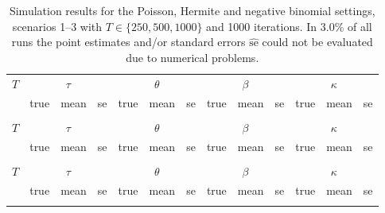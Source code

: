 \documentclass{article}
\begin{document}
\begin{table}[h!]
\footnotesize
\caption{Simulation results for the Poisson, Hermite and negative binomial settings, scenarios 1--3 with $T \in \{250, 500, 1000\}$ and 1000 iterations. In 3.0\% of all runs the point estimates and/or standard errors $\widehat{\text{se}}$ could not be evaluated due to numerical problems.}
\label{tab:sim_moments}
\center
\medskip
\begin{tabular}{p{0.3cm} @{\hskip 0.7cm} p{0.45cm} p{0.45cm} p{0.45cm} @{\hskip 0.7cm} p{0.45cm} p{0.45cm} p{0.45cm} @{\hskip 0.7cm} p{0.45cm} p{0.45cm} p{0.45cm} @{\hskip 0.7cm} p{0.45cm} p{0.45cm} p{0.45cm}}
\hline\noalign{\bigskip}
\multicolumn{13}{c}{Poisson}\\
\hline\noalign{\smallskip}
$T$ & \multicolumn{3}{c}{$\tau$} & \multicolumn{3}{c}{$\theta$} & \multicolumn{3}{c}{$\beta$} & \multicolumn{3}{c}{$\kappa$}\\
 \noalign{\smallskip}\hline\noalign{\smallskip}
& true & mean & se & true & mean & se & true & mean & se & true & mean & se \\
\noalign{\smallskip}\hline\noalign{\smallskip}

\noalign{\smallskip}\hline\noalign{\smallskip}

\noalign{\smallskip}\hline\noalign{\smallskip}

\hline\noalign{\bigskip}
\multicolumn{13}{c}{Hermite}\\
\hline\noalign{\smallskip}
$T$ & \multicolumn{3}{c}{$\tau$} & \multicolumn{3}{c}{$\theta$} & \multicolumn{3}{c}{$\beta$} & \multicolumn{3}{c}{$\kappa$}\\
\noalign{\smallskip}\hline\noalign{\smallskip}
& true & mean & se & true & mean & se & true & mean & se & true & mean & se \\

\noalign{\smallskip}\hline\noalign{\smallskip}

\noalign{\smallskip}\hline\noalign{\smallskip}

\noalign{\smallskip}\hline\noalign{\bigskip}
\multicolumn{13}{c}{Negative binomial}\\
\hline\noalign{\smallskip}
$T$ & \multicolumn{3}{c}{$\tau$} & \multicolumn{3}{c}{$\theta$} & \multicolumn{3}{c}{$\beta$} & \multicolumn{3}{c}{$\kappa$}\\
\noalign{\smallskip}\hline\noalign{\smallskip}
& true & mean & se & true & mean & se & true & mean & se & true & mean & se \\
\noalign{\smallskip}\hline\noalign{\smallskip}

\noalign{\smallskip}\hline\noalign{\smallskip}

\noalign{\smallskip}\hline\noalign{\smallskip}

\noalign{\smallskip}\hline\noalign{\smallskip}
\end{tabular}
\end{table}
\end{document}
